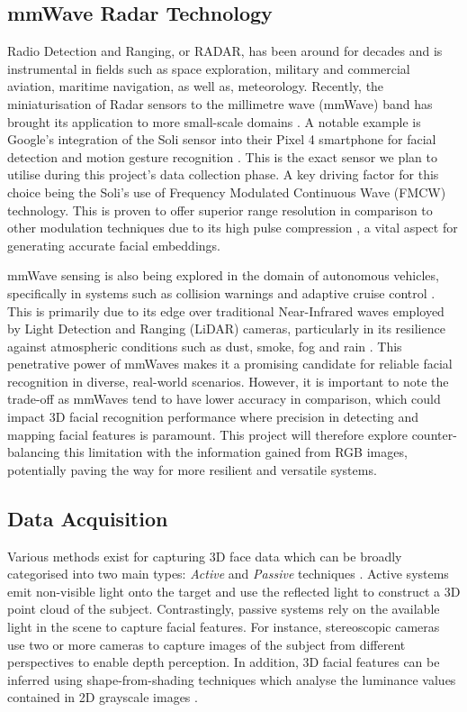 \documentclass{interim}
\begin{document}
\subsection{mmWave Radar Technology}
Radio Detection and Ranging, or RADAR, has been around for decades and is instrumental in fields such as space exploration, military and commercial aviation, maritime navigation, as well as, meteorology. Recently, the miniaturisation of Radar sensors to the millimetre wave (mmWave) band has brought its application to more small-scale domains \cite{soumya2023recent}. A notable example is Google's integration of the Soli sensor into their Pixel 4 smartphone for facial detection and motion gesture recognition \cite{googleblog2020}. This is the exact sensor we plan to utilise during this project's data collection phase. A key driving factor for this choice being the Soli's use of Frequency Modulated Continuous Wave (FMCW) technology. This is proven to offer superior range resolution in comparison to other modulation techniques due to its high pulse compression \cite{mahafza2005radar}, a vital aspect for generating accurate facial embeddings. 

mmWave sensing is also being explored in the domain of autonomous vehicles, specifically in systems such as collision warnings and adaptive cruise control \cite{dfrobot}. This is primarily due to its edge over traditional Near-Infrared waves employed by Light Detection and Ranging (LiDAR) cameras, particularly in its resilience against atmospheric conditions such as dust, smoke, fog and rain \cite{cadenceblog2022}. This penetrative power of mmWaves makes it a promising candidate for reliable facial recognition in diverse, real-world scenarios. However, it is important to note the trade-off as mmWaves tend to have lower accuracy in comparison, which could impact 3D facial recognition performance where precision in detecting and mapping facial features is paramount. This project will therefore explore counter-balancing this limitation with the information gained from RGB images, potentially paving the way for more resilient and versatile systems.


\subsection{Data Acquisition}
Various methods exist for capturing 3D face data which can be broadly categorised into two main types: \textit{Active} and \textit{Passive} techniques \cite{zhou20183d}. Active systems emit non-visible light onto the target and use the reflected light to construct a 3D point cloud of the subject. Contrastingly, passive systems rely on the available light in the scene to capture facial features. For instance, stereoscopic cameras use two or more cameras to capture images of the subject from different perspectives to enable depth perception. In addition, 3D facial features can be inferred using shape-from-shading techniques which analyse the luminance values contained in 2D grayscale images \cite{horn1977understanding}.
\end{document}
